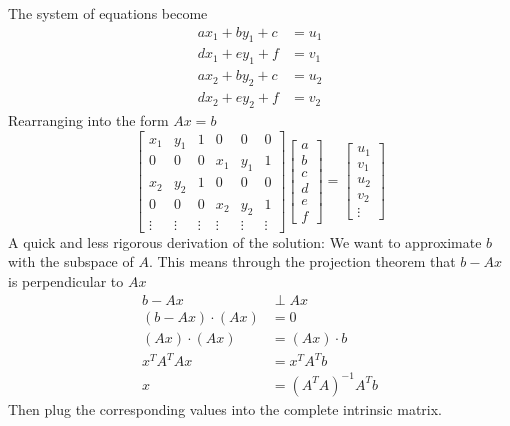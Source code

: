 The system of equations become
\begin{align*}
ax_1 + by_1+c &= u_1 \\
dx_1 + ey_1+f &= v_1 \\
ax_2 + by_2+c &= u_2 \\
dx_2 + ey_2+f &= v_2
\end{align*} 
Rearranging into the form $Ax=b$
$$\begin{bmatrix}  x_1 & y_1 & 1 & 0 & 0 & 0 \\ 0 & 0 & 0 & x_1 & y_1 & 1 \\ x_2 & y_2 & 1 & 0 & 0 & 0 \\ 0 & 0 & 0 & x_2 & y_2 & 1 \\ \vdots & \vdots &\vdots &\vdots &\vdots &\vdots \end{bmatrix}\left[\begin{array}{c} a \\ b \\ c \\d \\ e \\ f \end{array}\right]=\begin{bmatrix}  u_1 \\ v_1 \\ u_2 \\ v_2 \\ \vdots \end{bmatrix}$$
A quick and less rigorous derivation of the solution: We want to approximate $b$ with the subspace of $A$. This means through the projection theorem that $b-Ax$ is perpendicular to $Ax$
\begin{align*}
b-Ax &\perp Ax \\
(b-Ax) \cdot (Ax) &= 0 \\
(Ax) \cdot (Ax) &= (Ax) \cdot b \\
x^TA^TAx &= x^TA^Tb \\
x &= (A^TA)^{-1}A^Tb
\end{align*}
Then plug the corresponding values into the complete intrinsic matrix.

